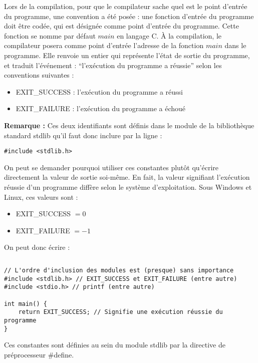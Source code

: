\documentclass[../../../main.tex]{subfiles}
\begin{document}
Lors de la compilation, pour que le compilateur sache quel est le point d'entrée du programme, une convention a été posée : une fonction d'entrée du programme doit être codée, qui est désignée comme point d'entrée du programme. Cette fonction se nomme par défaut $main$ en langage C. À la compilation, le compilateur posera comme point d'entrée l'adresse de la fonction $main$ dans le programme. Elle renvoie un entier qui représente l'état de sortie du programme, et traduit l'événement : ``l'exécution du programme a réussie'' selon les conventions suivantes :
\begin{itemize}
	\item \textsf{EXIT\_SUCCESS} : l'exécution du programme a réussi
	\item \textsf{EXIT\_FAILURE} : l'exécution du programme a échoué
\end{itemize}
\textbf{Remarque :} Ces deux identifiants sont définis dans le module de la bibliothèque standard \textsf{stdlib} qu'il faut donc inclure par la ligne :
\begin{verbatim}
#include <stdlib.h>
\end{verbatim}
On peut se demander pourquoi utiliser ces constantes plutôt qu'écrire directement la valeur de sortie soi-même. En fait, la valeur signifiant l'exécution réussie d'un programme diffère selon le système d'exploitation. Sous Windows et Linux, ces valeurs sont :
\begin{itemize}
	\item \textsf{EXIT\_SUCCESS} $ = 0$
	\item \textsf{EXIT\_FAILURE} $ = -1$
\end{itemize}
On peut donc écrire :
\begin{lstlisting}[title=Exemple]
\end{lstlisting}
\begin{verbatim}
// L'ordre d'inclusion des modules est (presque) sans importance
#include <stdlib.h> // EXIT_SUCCESS et EXIT_FAILURE (entre autre)
#include <stdio.h> // printf (entre autre)

int main() {
	return EXIT_SUCCESS; // Signifie une exécution réussie du programme
}
\end{verbatim}
Ces constantes sont définies au sein du module \textsf{stdlib} par la directive de préprocesseur \textsf{\#define}.
\newpage
\end{document}
